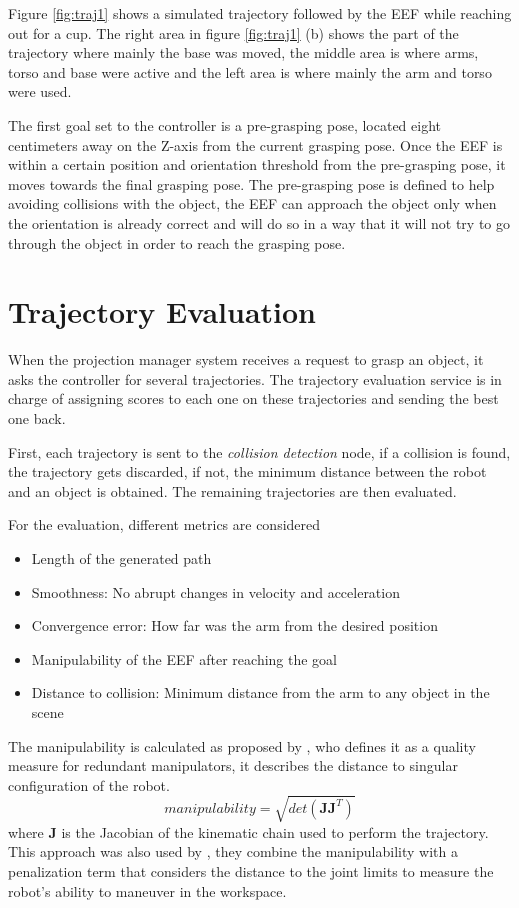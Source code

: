 Figure \ref{fig:traj1} shows a simulated trajectory followed by the EEF while reaching out for a cup. The right area in figure \ref{fig:traj1} (b) shows the part of the trajectory where mainly the base was moved, the middle area is where arms, torso and base were active and the left area is where mainly the arm and torso were used.

The first goal set to the controller is a pre-grasping pose, located eight centimeters away on the Z-axis from the current grasping pose. Once the EEF is within a certain position and orientation threshold from the  pre-grasping pose, it moves towards the final grasping pose. The pre-grasping pose is defined to help avoiding collisions with the object, the EEF can approach the object only when the orientation is already correct and will do so in a way that it will not try to go through the object in order to reach the grasping pose.

\section{Trajectory Evaluation}
\label{sec:traj_eval}

When the projection manager system receives a request to grasp an object, it asks the controller for several trajectories. The trajectory evaluation service is in charge of assigning scores to each one on these trajectories and sending the best one back.

First, each trajectory is sent to the \textit{collision detection} node, if a collision is found, the trajectory gets discarded, if not, the minimum distance between the robot and an object is obtained. The remaining trajectories are then evaluated.

For the evaluation, different metrics are considered
\begin{itemize}
	\item Length of the generated path
	\item Smoothness: No abrupt changes in velocity and acceleration
	\item Convergence error: How far was the arm from the desired position
	\item Manipulability of the EEF after reaching the goal
	\item Distance to collision: Minimum distance from the arm to any object in the scene
\end{itemize}


The manipulability is calculated as proposed by \cite{Yoshikawa}, who defines it as a quality measure for redundant manipulators, it describes the distance to singular configuration of the robot.
$$
manipulability = \sqrt{det(\textbf{JJ}^{T})}
$$
where $\textbf{J}$ is the Jacobian of the kinematic chain used to perform the trajectory. This approach was also used by \cite{manip_analysis}, they combine the manipulability with a penalization term that considers the distance to the joint limits to measure the robot's ability to maneuver in the workspace.

